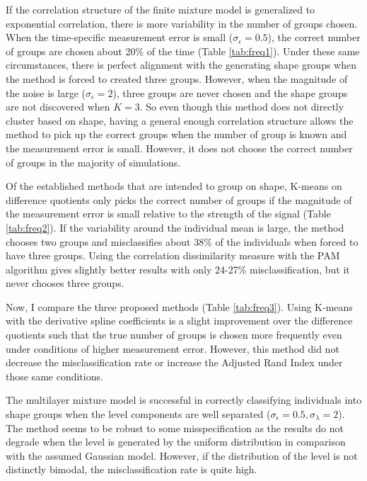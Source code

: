 If the correlation structure of the finite mixture model is generalized to exponential correlation, there is more variability in the number of groups chosen. When the time-specific measurement error is small ($\sigma_{\epsilon}=0.5$), the correct number of groups are chosen about 20\% of the time (Table \ref{tab:freq1}). Under these same circumstances, there is perfect alignment with the generating shape groups when the method is forced to created three groups. However, when the magnitude of the noise is large ($\sigma_{\epsilon}=2$), three groups are never chosen and the shape groups are not discovered when $K=3$. So even though this method does not directly cluster based on shape, having a general enough correlation structure allows the method to pick up the correct groups when the number of group is known and the measurement error is small. However, it does not choose the correct number of groups in the majority of simulations. 

Of the established methods that are intended to group on shape, K-means on difference quotients only picks the correct number of groups if the magnitude of the measurement error is small relative to the strength of the signal (Table \ref{tab:freq2}). If the variability around the individual mean is large, the method chooses two groups and misclassifies about 38\% of the individuals when forced to have three groups. Using the correlation dissimilarity measure with the PAM algorithm gives slightly better results with only 24-27\% misclassification, but it never chooses three groups.

Now, I compare the three proposed methods (Table \ref{tab:freq3}). Using K-means with the derivative spline coefficients is a slight improvement over the difference quotients such that the true number of groups is chosen more frequently even under conditions of higher measurement error. However, this method did not decrease the misclassification rate or increase the Adjusted Rand Index under those same conditions. 

The multilayer mixture model is successful in correctly classifying individuals into shape groups when the level components are well separated ($\sigma_{\epsilon}=0.5, \sigma_{\lambda}=2$). The method seems to be robust to some misspecification as the results do not degrade when the level is generated by the uniform distribution in comparison with the assumed Gaussian model. However, if the distribution of the level is not distinctly bimodal, the misclassification rate is quite high.

